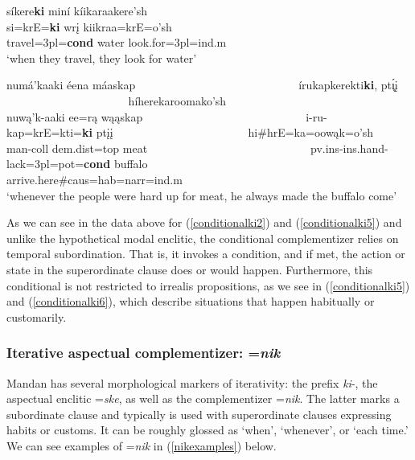 \begin{exe}
\begin{xlist}
	\item\label{conditionalki5}
	\glll síkere\textbf{ki} miní kíikaraakere'sh\\
	si=krE=\textbf{ki} wrį kiikraa=krE=o'sh\\
	\textnormal{travel}=3pl=\textbf{cond} \textnormal{water} \textnormal{look.for}=3pl=ind.m\\
	\glt `when they travel, they look for water' \citep[451]{hollow1970}

	\item\label{conditionalki6}
	\glll numá'kaaki éena máaskap ~ ~ ~ ~ ~ ~ ~ ~ ~ ~ ~ ~ ~ ~ ~ ~ ~ írukapkerekti\textbf{ki}, pt\'{ı̨}į ~ ~ ~ ~ ~ ~ ~ ~ ~ ~ ~ ~ ~ ~ híherekaroomako'sh\\
	nuwą'k-aaki ee=rą wąąskap ~ ~ ~ ~ ~ ~ ~ ~ ~ ~ ~ ~ ~ ~ ~ ~ ~ i-ru-kap=krE=kti=\textbf{ki} ptįį ~ ~ ~ ~ ~ ~ ~ ~ ~ ~ ~ ~ ~ ~  hi\#hrE=ka=oowąk=o'sh\\
	\textnormal{man}-coll dem.dist=top \textnormal{meat} ~ ~ ~ ~ ~ ~ ~ ~ ~ ~ ~ ~ ~ ~ ~ ~ ~  pv.ins-ins.hand-\textnormal{lack}=3pl=pot=\textbf{cond} \textnormal{buffalo} ~ ~ ~ ~ ~ ~ ~ ~ ~ ~ ~ ~ ~ ~  \textnormal{arrive.here}\#caus=hab=narr=ind.m\\
	\glt `whenever the people were hard up for meat, he always made the buffalo come' \citep[301]{hollow1973b}
	
	\end{xlist}

\end{exe}

As we can see in the data above for (\ref{conditionalki2}) and (\ref{conditionalki5}) and unlike the hypothetical modal enclitic, the conditional complementizer relies on temporal subordination. That is, it invokes a condition, and if met, the action or state in the superordinate clause does or would happen. Furthermore, this conditional is not restricted to irrealis propositions, as we see in (\ref{conditionalki5}) and (\ref{conditionalki6}), which describe situations that happen habitually or customarily. 

\subsubsection{Iterative aspectual complementizer: =\textit{nik}}

Mandan has several morphological markers of iterativity: the prefix \textit{ki}-, the aspectual enclitic =\textit{ske}, as well as the complementizer =\textit{nik}. The latter marks a subordinate clause and typically is used with superordinate clauses expressing habits or customs. It can be roughly glossed as `when', `whenever', or `each time.' We can see examples of =\textit{nik} in (\ref{nikexamples}) below.

